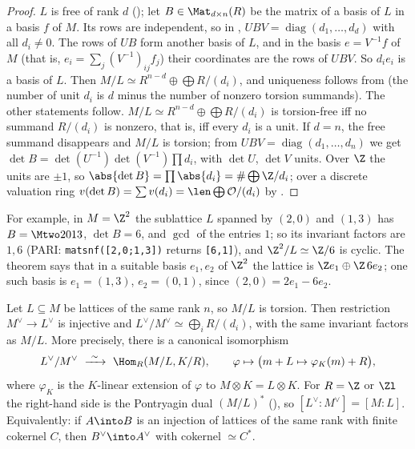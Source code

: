 \begin{proof}
$L$ is free of rank $d$ (); let $B\in\Mat_{d\times n}(R)$ be the matrix of a basis of $L$ in a basis $f$ of
$M$. Its rows are independent, so in , $UBV=\operatorname{diag}(d_1,\dots,d_d)$ with all $d_i\ne0$. The rows of $UB$ form another
basis of $L$, and in the basis $e=V^{-1}f$ of $M$ (that is, $e_i=\sum_j(V^{-1})_{ij}f_j$) their coordinates are the rows of $UBV$. So
$d_ie_i$ is a basis of $L$. Then $M/L\simeq R^{n-d}\oplus\bigoplus R/(d_i)$, and uniqueness follows from 
(the number of unit $d_i$ is $d$ minus the number of nonzero torsion summands). The other statements follow.
$M/L\simeq R^{n-d}\oplus\bigoplus R/(d_i)$ is torsion-free iff no summand $R/(d_i)$ is nonzero, that is, iff every $d_i$ is a unit. If $d=n$,
the free summand disappears and $M/L$ is torsion; from $UBV=\operatorname{diag}(d_1,\dots,d_n)$ we get $\det B=\det(U^{-1})\det(V^{-1})\prod d_i$, with
$\det U$, $\det V$ units. Over $\Z$ the units are $\pm1$, so $\abs{\det B}=\prod\abs{d_i}=\#\bigoplus\Z/d_i$; over a discrete valuation ring
$v(\det B)=\sum v(d_i)=\len\bigoplus\mathcal O/(d_i)$ by .
\end{proof}

For example, in $M=\Z^2$ the sublattice $L$ spanned by $(2,0)$ and $(1,3)$ has $B=\Mtwo2013$, $\det B=6$, and $\gcd$ of the entries $1$;
so its invariant factors are $1,6$ (PARI: \texttt{matsnf([2,0;1,3])} returns \texttt{[6,1]}), and $\Z^2/L\simeq\Z/6$ is cyclic. The theorem says that in a suitable basis $e_1,e_2$ of $\Z^2$ the lattice is $\Z e_1\oplus\Z\,6e_2$; one
such basis is $e_1=(1,3)$, $e_2=(0,1)$, since $(2,0)=2e_1-6e_2$.

\begin{proposition}\label{prop:modules:dual-inclusion}
Let $L\subseteq M$ be lattices of the same rank $n$, so $M/L$ is torsion. Then restriction $M^\vee\to L^\vee$ is injective and
$L^\vee/M^\vee\simeq\bigoplus_iR/(d_i)$, with the same invariant factors as $M/L$. More precisely, there is a canonical isomorphism
\[
L^\vee/M^\vee\ \xrightarrow{\ \sim\ }\ \Hom_R(M/L,K/R),\qquad\varphi\mapsto\bigl(m+L\mapsto\varphi_K(m)+R\bigr),
\]
where $\varphi_K$ is the $K$-linear extension of $\varphi$ to $M\otimes K=L\otimes K$. For $R=\Z$ or $\Zl$ the right-hand side is the Pontryagin dual
$(M/L)^*$ (), so $[L^\vee:M^\vee]=[M:L]$. Equivalently: if $A\into B$ is an injection of lattices of the same
rank with finite cokernel $C$, then $B^\vee\into A^\vee$ with cokernel $\simeq C^*$.
\end{proposition}

